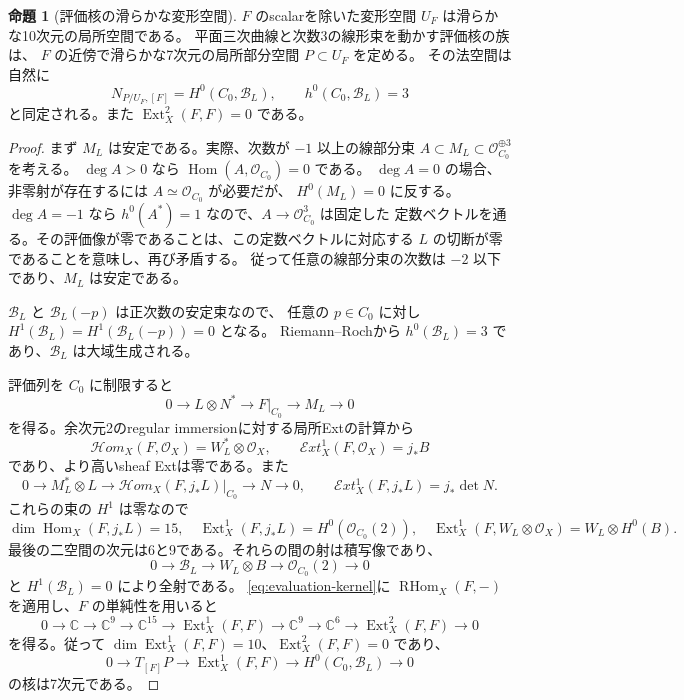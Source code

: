 \documentclass[a4paper,11pt]{ltjsarticle}
\theoremstyle{definition}
\newtheorem{theorem}{命題}[section]
\newcommand{\CC}{\mathbb C}
\newcommand{\OO}{\mathcal O}
\newcommand{\Ext}{\operatorname{Ext}}
\newcommand{\Hom}{\operatorname{Hom}}
\newcommand{\RHom}{\operatorname{RHom}}
\begin{document}
\begin{theorem}[評価核の滑らかな変形空間]\label{thm:evaluation-local-moduli}
$F$ のscalarを除いた変形空間 $U_F$ は滑らかな10次元の局所空間である。
平面三次曲線と次数3の線形束を動かす評価核の族は、
$F$ の近傍で滑らかな7次元の局所部分空間 $P\subset U_F$ を定める。
その法空間は自然に
\[
 N_{P/U_F,[F]}=H^0(C_0,\mathcal B_L),\qquad h^0(C_0,\mathcal B_L)=3
\]
と同定される。また $\Ext^2_X(F,F)=0$ である。
\end{theorem}

\begin{proof}
まず $M_L$ は安定である。実際、次数が $-1$ 以上の線部分束
$A\subset M_L\subset\OO_{C_0}^{\oplus3}$ を考える。
$\deg A>0$ なら $\Hom(A,\OO_{C_0})=0$ である。
$\deg A=0$ の場合、非零射が存在するには $A\simeq\OO_{C_0}$ が必要だが、
$H^0(M_L)=0$ に反する。
$\deg A=-1$ なら $h^0(A^*)=1$ なので、$A\to\OO_{C_0}^3$ は固定した
定数ベクトルを通る。その評価像が零であることは、この定数ベクトルに対応する
$L$ の切断が零であることを意味し、再び矛盾する。
従って任意の線部分束の次数は $-2$ 以下であり、$M_L$ は安定である。

$\mathcal B_L$ と $\mathcal B_L(-p)$ は正次数の安定束なので、
任意の $p\in C_0$ に対し $H^1(\mathcal B_L)=H^1(\mathcal B_L(-p))=0$ となる。
Riemann--Rochから $h^0(\mathcal B_L)=3$ であり、$\mathcal B_L$ は大域生成される。

評価列を $C_0$ に制限すると
\begin{equation}\label{eq:evaluation-restriction}
 0\longrightarrow L\otimes N^*\longrightarrow F|_{C_0}
   \longrightarrow M_L\longrightarrow0
\end{equation}
を得る。余次元2のregular immersionに対する局所Extの計算から
\[
 \mathcal Hom_X(F,\OO_X)=W_L^*\otimes\OO_X,
 \qquad \mathcal Ext^1_X(F,\OO_X)=j_*B
\]
であり、より高いsheaf Extは零である。また
\[
 0\longrightarrow M_L^*\otimes L\longrightarrow
 \mathcal Hom_X(F,j_*L)|_{C_0}\longrightarrow N\longrightarrow0,
 \qquad
 \mathcal Ext^1_X(F,j_*L)=j_*\det N.
\]
これらの束の $H^1$ は零なので
\[
 \dim\Hom_X(F,j_*L)=15,\quad
 \Ext^1_X(F,j_*L)=H^0(\OO_{C_0}(2)),\quad
 \Ext^1_X(F,W_L\otimes\OO_X)=W_L\otimes H^0(B).
\]
最後の二空間の次元は6と9である。それらの間の射は積写像であり、
\[
 0\longrightarrow\mathcal B_L\longrightarrow W_L\otimes B
   \longrightarrow\OO_{C_0}(2)\longrightarrow0
\]
と $H^1(\mathcal B_L)=0$ により全射である。
\eqref{eq:evaluation-kernel}に $\RHom_X(F,-)$ を適用し、$F$ の単純性を用いると
\[
 0\to\CC\to\CC^9\to\CC^{15}\to\Ext^1_X(F,F)
 \to\CC^9\to\CC^6\to\Ext^2_X(F,F)\to0
\]
を得る。従って $\dim\Ext^1_X(F,F)=10$、$\Ext^2_X(F,F)=0$ であり、
\begin{equation}\label{eq:normal-evaluation-sequence}
 0\longrightarrow T_{[F]}P\longrightarrow\Ext^1_X(F,F)
 \longrightarrow H^0(C_0,\mathcal B_L)\longrightarrow0
\end{equation}
の核は7次元である。


\end{proof}
\end{document}
